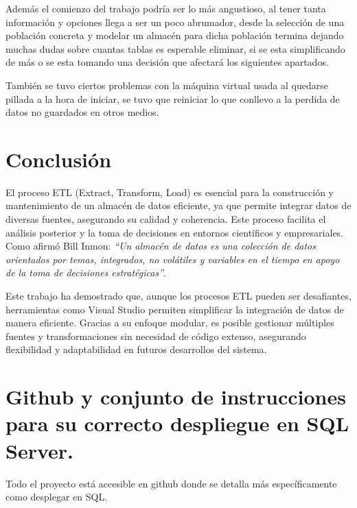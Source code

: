 \documentclass[12pt, a4paper, twoside]{article}
\begin{document}
	Además el comienzo del trabajo podría ser lo más angustioso, al tener tanta información y opciones llega a ser un poco abrumador, desde la selección de una población concreta y modelar un almacén para dicha población termina dejando muchas dudas sobre cuantas tablas es esperable eliminar, si se esta simplificando de más o se esta tomando una decisión que afectará los siguientes apartados. 
	
	También se tuvo ciertos problemas con la máquina virtual usada al quedarse pillada a la hora de iniciar, se tuvo que reiniciar lo que conllevo a la perdida de datos no guardados en otros medios.
	
	\section{Conclusión}
	
	El proceso ETL (Extract, Transform, Load) es esencial para la construcción y mantenimiento de un almacén de datos eficiente, ya que permite integrar datos de diversas fuentes, asegurando su calidad y coherencia. Este proceso facilita el análisis posterior y la toma de decisiones en entornos científicos y empresariales. Como afirmó Bill Inmon: \textit{“Un almacén de datos es una colección de datos orientados por temas, integrados, no volátiles y variables en el tiempo en apoyo de la toma de decisiones estratégicas”}.
	
	Este trabajo ha demostrado que, aunque los procesos ETL pueden ser desafiantes, herramientas como Visual Studio permiten simplificar la integración de datos de manera eficiente. Gracias a su enfoque modular, es posible gestionar múltiples fuentes y transformaciones sin necesidad de código extenso, asegurando flexibilidad y adaptabilidad en futuros desarrollos del sistema.
	


	\section{Github y conjunto de instrucciones para su correcto despliegue en SQL Server.}

	Todo el proyecto está accesible en github \cite{depab2024} donde se detalla más específicamente como desplegar en SQL.
	\printbibliography
	
	
	
	
\end{document}
